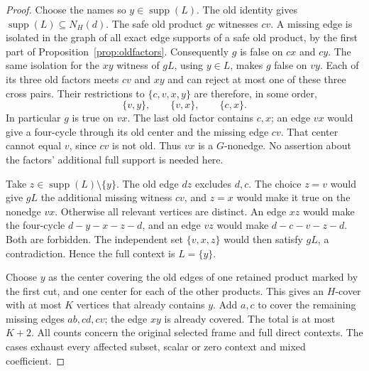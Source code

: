 \documentclass[11pt]{article}
\newcommand{\supp}{\operatorname{supp}}
\theoremstyle{definition}
\theoremstyle{remark}
\begin{document}
\begin{proof}
Choose the names so $y\in\supp(L)$. The old identity gives
$\supp(L)\subseteq N_H(d)$. The safe old product $gc$ witnesses $cv$.
A missing edge is isolated in the graph of all exact edge supports of a
safe old product, by the first part of Proposition~\ref{prop:oldfactors}.
Consequently $g$ is false on $cx$ and $cy$. The same isolation for the
$xy$ witness of $gL$, using $y\in L$, makes $g$ false on $vy$.
Each of its three old factors meets $cv$ and $xy$ and can reject at most
one of these three cross pairs. Their restrictions to $\{c,v,x,y\}$ are
therefore, in some order,
\[
 \{v,y\},\qquad\{v,x\},\qquad\{c,x\}.
\]
In particular $g$ is true on $vx$. The last old factor contains $c,x$;
an edge $vx$ would give a four-cycle through its old center and the
missing edge $cv$. That center cannot equal $v$, since $cv$ is not old.
Thus $vx$ is a $G$-nonedge. No assertion about the factors' additional
full support is needed here.

Take $z\in\supp(L)\setminus\{y\}$. The old edge $dz$ excludes $d,c$.
The choice $z=v$ would give $gL$ the additional missing witness $cv$,
and $z=x$ would make it true on the nonedge $vx$. Otherwise all relevant
vertices are distinct. An edge $xz$ would make the four-cycle
$d-y-x-z-d$, and an edge $vz$ would make $d-c-v-z-d$. Both are forbidden.
The independent set $\{v,x,z\}$ would then satisfy $gL$, a contradiction.
Hence the full context is $L=\{y\}$.

Choose $y$ as the center covering the old edges of one retained product
marked by the first cut, and one center for each of the other products.
This gives an $H$-cover with at most $K$ vertices that already contains
$y$. Add $a,c$ to cover the remaining missing edges $ab,cd,cv$; the edge
$xy$ is already covered. The total is at most $K+2$. All counts concern
the original selected frame and full direct contexts. The cases exhaust
every affected subset, scalar or zero context and mixed coefficient.
\end{proof}
\end{document}
